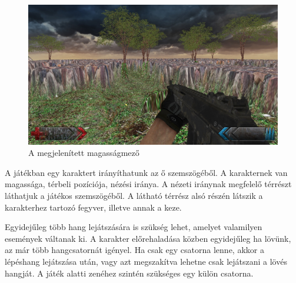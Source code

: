 \begin{figure}[h]
\centering
\includegraphics[scale=0.4]{kepek/screenshot.png}
\caption{A megjelenített magasságmező}
\label{fig:screenshot}
\end{figure}


A játékban egy karaktert irányíthatunk az ő szemszögéből. A karakternek van magassága, térbeli pozíciója, nézési iránya. A nézeti iránynak megfelelő térrészt láthatjuk a játékos szemszögéből. A látható térrész alsó részén látszik a karakterhez tartozó fegyver, illetve annak a keze.




Egyidejűleg több hang lejátszására is szükség lehet, amelyet valamilyen események váltanak ki. A karakter előrehaladása közben egyidejűleg ha lövünk, az már több hangcsatornát igényel. Ha csak egy csatorna lenne, akkor a lépéshang lejátszása után, vagy azt megszakítva lehetne csak lejátszani a lövés hangját. A játék alatti zenéhez szintén szükséges egy külön csatorna.

